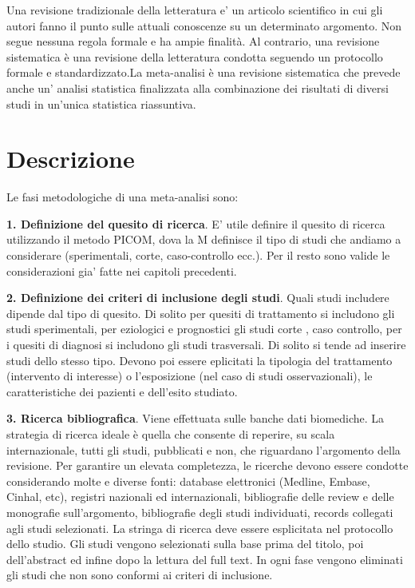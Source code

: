 \documentclass[]{book}
\begin{document}
Una revisione tradizionale della letteratura e' un articolo scientifico in cui gli autori fanno il punto sulle attuali conoscenze su un determinato argomento. Non segue nessuna regola formale e ha ampie finalità. Al contrario, una revisione sistematica è una revisione della letteratura condotta seguendo un protocollo formale e standardizzato.La meta-analisi è una revisione sistematica che prevede anche un' analisi statistica finalizzata alla combinazione dei risultati di diversi studi in un'unica statistica riassuntiva.

\hypertarget{descrizione-4}{%
\section{Descrizione}\label{descrizione-4}}

Le fasi metodologiche di una meta-analisi sono:

\textbf{1. Definizione del quesito di ricerca}. E' utile definire il quesito di ricerca utilizzando il metodo PICOM, dova la M definisce il tipo di studi che andiamo a considerare (sperimentali, corte, caso-controllo ecc.). Per il resto sono valide le considerazioni gia' fatte nei capitoli precedenti.

\textbf{2. Definizione dei criteri di inclusione degli studi}. Quali studi includere dipende dal tipo di quesito. Di solito per quesiti di trattamento si includono gli studi sperimentali, per eziologici e prognostici gli studi corte , caso controllo, per i quesiti di diagnosi si includono gli studi trasversali. Di solito si tende ad inserire studi dello stesso tipo. Devono poi essere eplicitati la tipologia del trattamento (intervento di interesse) o l'esposizione (nel caso di studi osservazionali), le caratteristiche dei pazienti e dell'esito studiato.

\textbf{3. Ricerca bibliografica}. Viene effettuata sulle banche dati biomediche. La strategia di ricerca ideale è quella che consente di reperire, su scala internazionale, tutti gli studi, pubblicati e non, che riguardano l'argomento della revisione. Per garantire un elevata completezza, le ricerche devono essere condotte considerando molte e diverse fonti: database elettronici (Medline, Embase, Cinhal, etc), registri nazionali ed internazionali, bibliografie delle review e delle monografie sull'argomento, bibliografie degli studi individuati, records collegati agli studi selezionati. La stringa di ricerca deve essere esplicitata nel protocollo dello studio. Gli studi vengono selezionati sulla base prima del titolo, poi dell'abstract ed infine dopo la lettura del full text. In ogni fase vengono eliminati gli studi che non sono conformi ai criteri di inclusione.
\end{document}
